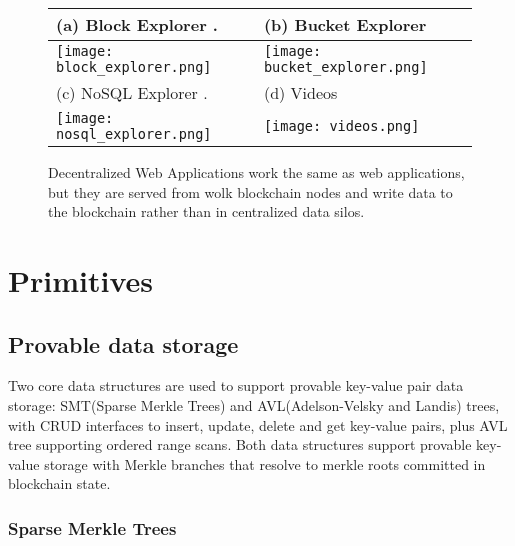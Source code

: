 \documentclass[journal]{IEEEtran}
\begin{document}
\begin{figure*}[h]
\begin{scriptsize}
    \begin{tabular}{|l|l|} \hline
    (a) Block Explorer .                 & (b) Bucket Explorer \\ \hline
    \texttt{[image: block\_explorer.png]} & \texttt{[image: bucket\_explorer.png]} \\ \hline
    (c) NoSQL Explorer .                 & (d) Videos \\ \hline
    \texttt{[image: nosql\_explorer.png]} & \texttt{[image: videos.png]}      \\ \hline
    \hline
     \end{tabular}
\end{scriptsize}
    \caption{Decentralized Web Applications work the same as web applications, but they are served from wolk blockchain nodes
    and write data to the blockchain rather than in centralized data silos.}
    \label{fig:applications}
\end{figure*}


\section{Primitives}

\subsection{Provable data storage}
\label{sec:provabledatastorage}

Two core data structures are used to support provable key-value pair data storage: SMT(Sparse Merkle Trees) and AVL(Adelson-Velsky and Landis) trees, with CRUD interfaces to insert, update, delete and get key-value pairs, plus AVL tree supporting ordered range scans.  Both data structures support provable key-value storage with Merkle branches that resolve to merkle roots committed in blockchain state.

\subsubsection{Sparse Merkle Trees}
\end{document}
